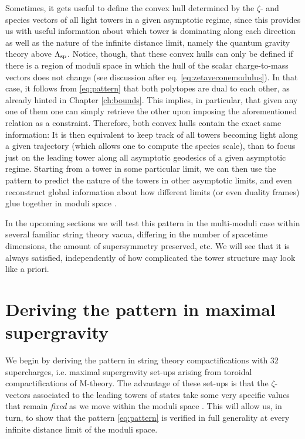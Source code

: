 Sometimes, it gets useful to define the convex hull determined by the $\zeta$- and species vectors of all light towers in a given asymptotic regime, since this provides us with useful information about which tower is dominating along each direction as well as the nature of the infinite distance limit, namely the quantum gravity theory above $\Lambda_{\text{sp}}$. Notice, though, that these convex hulls can only be defined if there is a region of moduli space in which the hull of the scalar charge-to-mass vectors does not change (see discussion after eq. \eqref{eq:zetaveconemodulus}). In that case, it follows from \eqref{eq:pattern} that both polytopes are dual to each other, as already hinted in Chapter \ref{ch:bounds}. This implies, in particular, that given any one of them one can simply retrieve the other upon imposing the aforementioned relation as a constraint. Therefore, both convex hulls contain the exact same information: It is then equivalent to keep track of all towers becoming light along a given trajectory (which allows one to compute the species scale), than to focus just on the leading tower along all asymptotic geodesics of a given asymptotic regime. Starting from a tower in some particular limit, we can then use the pattern to predict the nature of the towers in other asymptotic limits, and even reconstruct global information about how different limits (or even duality frames) glue together in moduli space \cite{Etheredge:2024tok}. %
	
In the upcoming sections we will test this pattern in the multi-moduli case within several familiar string theory vacua, differing in the number of spacetime dimensions, the amount of supersymmetry preserved, etc. We will see that it is always satisfied, independently of how complicated the tower structure may look like a priori.
 
\section{Deriving the pattern in maximal supergravity}\label{s:maxsugra} 

We begin by deriving the pattern in string theory compactifications with 32 supercharges, i.e. maximal supergravity set-ups arising from toroidal compactifications of M-theory. The advantage of these set-ups is that the $\zeta$-vectors associated to the leading towers of states take some very specific values that remain \emph{fixed} as we move within the moduli space \cite{Etheredge:2022opl}. This will allow us, in turn, to show that the pattern \eqref{eq:pattern} is verified in full generality at every infinite distance limit of the moduli space.
	
